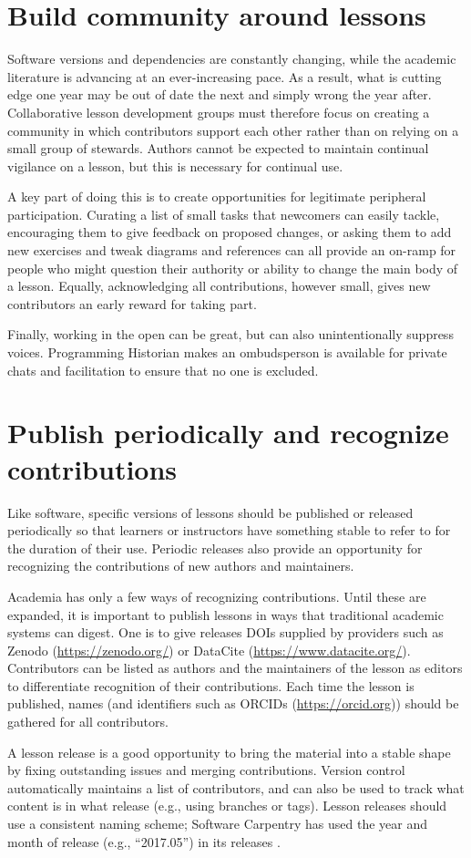 \documentclass[10pt,letterpaper]{article}
\newcommand{\rulemajor}[2]{\section{#1}\label{#2}}
\begin{document}
\rulemajor{Build community around lessons}{community}

Software versions and dependencies are constantly changing,
while the academic literature is advancing at an ever-increasing pace.
As a result,
what is cutting edge one year may be out of date the next and simply wrong the year after.
Collaborative lesson development groups must therefore focus
on creating a community in which contributors support each other
rather than on relying on a small group of stewards.
Authors cannot be expected to maintain continual vigilance on a lesson,
but this is necessary for continual use.

A key part of doing this is to create opportunities for legitimate peripheral participation.
Curating a list of small tasks that newcomers can easily tackle,
encouraging them to give feedback on proposed changes,
or asking them to add new exercises and tweak diagrams and references
can all provide an on-ramp for people who might question their authority or ability to change the main body of a lesson.
Equally,
acknowledging all contributions,
however small,
gives new contributors an early reward for taking part.

Finally,
working in the open can be great,
but can also unintentionally suppress voices.
Programming Historian makes an ombudsperson is available for private chats and facilitation
to ensure that no one is excluded.

\rulemajor{Publish periodically and recognize contributions}{publish}

Like software,
specific versions of lessons should be published or released periodically
so that learners or instructors have something stable to refer to for the duration of their use.
Periodic releases also provide an opportunity
for recognizing the contributions of new authors and maintainers.

Academia has only a few ways of recognizing contributions.
Until these are expanded,
it is important to publish lessons in ways that traditional academic systems can digest.
One is to give releases DOIs supplied by providers such as Zenodo (\url{https://zenodo.org/})
or DataCite (\url{https://www.datacite.org/}).
Contributors can be listed as authors
and the maintainers of the lesson as editors
to differentiate recognition of their contributions.
Each time the lesson is published,
names (and identifiers such as ORCIDs (\url{https://orcid.org}))
should be gathered for all contributors.

A lesson release is a good opportunity to bring the material into a stable shape
by fixing outstanding issues and merging contributions.
Version control automatically maintains a list of contributors,
and can also be used to track what content is in what release
(e.g., using branches or tags).
Lesson releases should use a consistent naming scheme;
Software Carpentry has used the year and month of release
(e.g., ``2017.05'')
in its releases \cite{shell2015,shell2017}.
\end{document}
